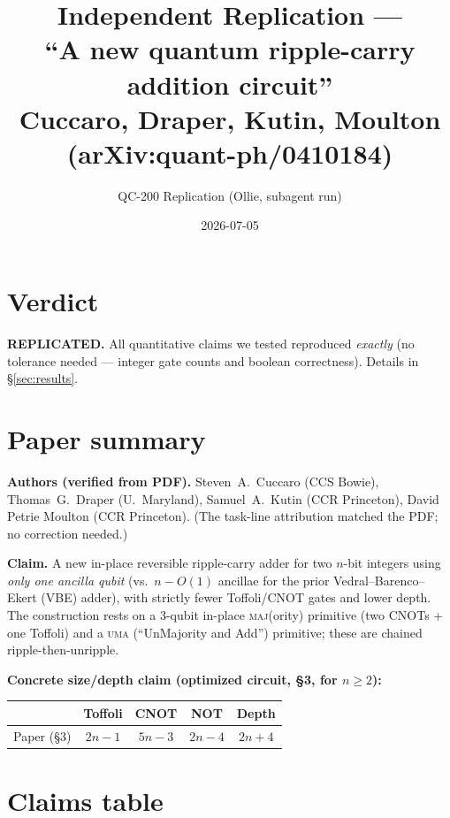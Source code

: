 \documentclass[11pt]{article}
\title{Independent Replication --- \\
       ``A new quantum ripple-carry addition circuit'' \\
       Cuccaro, Draper, Kutin, Moulton (arXiv:quant-ph/0410184)}
\author{QC-200 Replication (Ollie, subagent run)}
\date{2026-07-05}
\begin{document}
\maketitle

\section*{Verdict}
\textbf{REPLICATED.} All quantitative claims we tested reproduced \emph{exactly}
(no tolerance needed --- integer gate counts and boolean correctness). Details in
\S\ref{sec:results}.

\section{Paper summary}

\textbf{Authors (verified from PDF).} Steven~A.\ Cuccaro (CCS Bowie), Thomas~G.\
Draper (U.~Maryland), Samuel~A.\ Kutin (CCR Princeton), David Petrie Moulton (CCR
Princeton). (The task-line attribution matched the PDF; no correction needed.)

\textbf{Claim.} A new in-place reversible ripple-carry adder for two $n$-bit
integers using \emph{only one ancilla qubit} (vs.\ $n-O(1)$ ancillae for the
prior Vedral--Barenco--Ekert (VBE) adder), with strictly fewer Toffoli/CNOT
gates and lower depth. The construction rests on a 3-qubit in-place
\textsc{maj}(ority) primitive (two CNOTs + one Toffoli) and a
\textsc{uma} (``UnMajority and Add'') primitive; these are chained ripple-then-unripple.

\textbf{Concrete size/depth claim (optimized circuit, \S3, for $n \ge 2$):}
\begin{center}
\begin{tabular}{lcccc}
\toprule
                    & Toffoli & CNOT   & NOT     & Depth \\ \midrule
Paper (\S3)         & $2n-1$  & $5n-3$ & $2n-4$  & $2n+4$ \\
\bottomrule
\end{tabular}
\end{center}

\section{Claims table}
\end{document}
